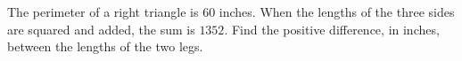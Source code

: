 The perimeter of a right triangle is $60$ inches. When the lengths of the three sides are squared and added, the sum is $1352$. Find the positive difference, in inches, between the lengths of the two legs.
